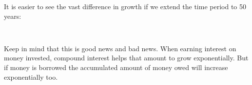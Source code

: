 It is easier to see the vast difference in growth if we extend the time period to 50 years:
\begin{figure}[H]
    \begin{center}
\\
	\label{FG:fig:SI10}
    \end{center}
\end{figure}


Keep in mind that this is good news and bad news. When earning interest on money invested, compound interest helps that amount to grow exponentially. But if money is borrowed the accumulated amount of money owed will increase exponentially too.


